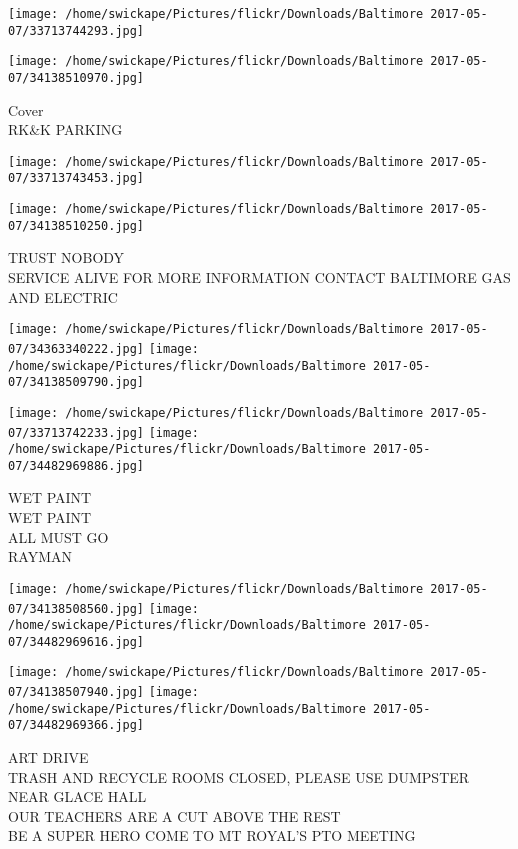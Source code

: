\documentclass[10pt,letterpaper]{article}
\begin{document}
\texttt{[image: /home/swickape/Pictures/flickr/Downloads/Baltimore 2017-05-07/33713744293.jpg]}

\vspace{0.25in}
\texttt{[image: /home/swickape/Pictures/flickr/Downloads/Baltimore 2017-05-07/34138510970.jpg]}

Cover\\
RK\&K PARKING\\
\pagebreak

\texttt{[image: /home/swickape/Pictures/flickr/Downloads/Baltimore 2017-05-07/33713743453.jpg]}

\vspace{0.25in}
\texttt{[image: /home/swickape/Pictures/flickr/Downloads/Baltimore 2017-05-07/34138510250.jpg]}

TRUST NOBODY\\
SERVICE ALIVE FOR MORE INFORMATION CONTACT BALTIMORE GAS AND ELECTRIC\\
\pagebreak

\texttt{[image: /home/swickape/Pictures/flickr/Downloads/Baltimore 2017-05-07/34363340222.jpg]}
\texttt{[image: /home/swickape/Pictures/flickr/Downloads/Baltimore 2017-05-07/34138509790.jpg]}

\texttt{[image: /home/swickape/Pictures/flickr/Downloads/Baltimore 2017-05-07/33713742233.jpg]}
\texttt{[image: /home/swickape/Pictures/flickr/Downloads/Baltimore 2017-05-07/34482969886.jpg]}

WET PAINT\\
WET PAINT\\
ALL MUST GO\\
RAYMAN\\
\pagebreak

\texttt{[image: /home/swickape/Pictures/flickr/Downloads/Baltimore 2017-05-07/34138508560.jpg]}
\texttt{[image: /home/swickape/Pictures/flickr/Downloads/Baltimore 2017-05-07/34482969616.jpg]}

\texttt{[image: /home/swickape/Pictures/flickr/Downloads/Baltimore 2017-05-07/34138507940.jpg]}
\texttt{[image: /home/swickape/Pictures/flickr/Downloads/Baltimore 2017-05-07/34482969366.jpg]}

ART DRIVE\\
TRASH AND RECYCLE ROOMS CLOSED, PLEASE USE DUMPSTER NEAR GLACE HALL\\
OUR TEACHERS ARE A CUT ABOVE THE REST\\
BE A SUPER HERO COME TO MT ROYAL'S PTO MEETING\\
\pagebreak
\end{document}
